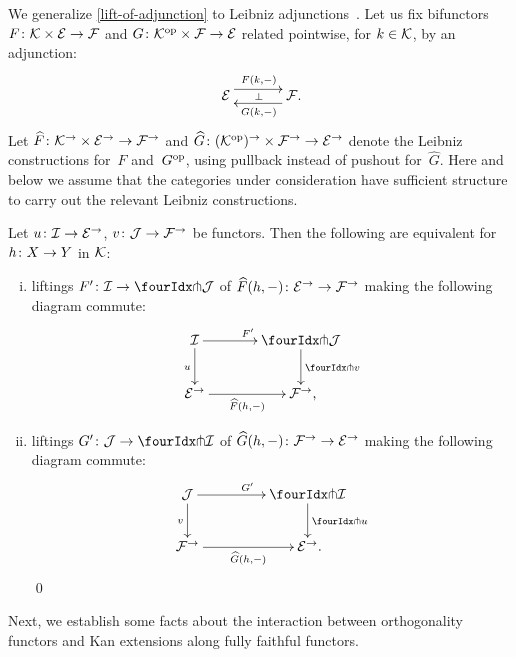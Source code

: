 \documentclass[reqno,10pt,a4paper,oneside,draft]{amsart}
\begin{document}
{{We generalize \cref{lift-of-adjunction} to Leibniz adjunctions~\cite{riehl-verity:reedy}.
Let us fix bifunctors $F \co \cal{K} \times \catE \to \cal{F}$ and $G \co \cal{K}^{\op} \times \cal{F} \to \catE$ related pointwise, for $k \in \cal{K}$, by an adjunction:
\[
\xymatrix@C+1em{
  \catE
  \ar@<5pt>[r]^{F(k, \arghole)}
  \ar@{}[r]|{\bot}
&
  \cal{F}
  \ar@<5pt>[l]^{G(k, \arghole)}
\rlap{.}}
\]
Let $ \widehat{F} \co \cal{K}^\to \times \catE^\to \to \cal{F}^\to$ and $ \widehat{G} \co (\cal{K}^{\op})^\to \times \cal{F}^\to \to \catE^\to$ denote the Leibniz constructions for~$F$ and~$G^{\op}$, using pullback instead of pushout for~$\widehat{G}$.
Here and below we assume that the categories under consideration have sufficient structure to carry out the relevant Leibniz constructions.

\begin{proposition} \label{lift-of-leibniz-adjunction}
Let $u \co \cal{I} \to \catE^\to$, $v \co \cal{J} \to \cal{F}^\to$ be functors.
Then the following are equivalent for $h \co X \to Y$ in $\cal{K}$:
\begin{enumerate}[(i)]
\item liftings $F' \co \cal{I} \to \liftl{\cal{J}}$ of $\widehat{F}(h, \arghole) \co \catE^\to \to \cal{F}^\to$ making the following diagram commute:
\[
\xymatrix@C=1.2cm{
  \cal{I}
  \ar[r]^{F'}
  \ar[d]_{u}
&
  \liftl{\cal{J}}
  \ar[d]^{\liftl{v}}
\\
  \catE^\to
  \ar[r]_-{\widehat{F}(h, \arghole)}
&
  \cal{F}^\to
\rlap{,}}
\]
\item liftings $G' \co \cal{J} \to \liftr{\cal{I}}$ of $\widehat{G}(h, \arghole) \co \cal{F}^\to \to \catE^\to$ making the following diagram commute:
\[
\begin{gathered}
\xymatrix@C+2em{
  \cal{J}
  \ar[d]_{v}
  \ar[r]^{G'}
&
  \liftr{\cal{I}}
  \ar[d]^{\liftr{u}}
\\
  \cal{F}^\to
  \ar[r]_-{\widehat{G}(h, \arghole)}
&
  \catE^\to
\rlap{.}}
\end{gathered}
\]
 \qed
\end{enumerate}
\end{proposition}


Next, we establish some facts about the interaction between orthogonality functors and Kan extensions along fully faithful functors.

}}
\end{document}
